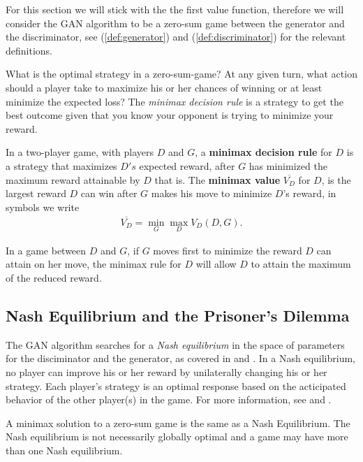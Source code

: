\begin{remark} For this section we will stick with the the first value
  function, therefore we will consider the GAN algorithm to be a
  zero-sum game between the generator and the discriminator, see
  (\ref{def:generator}) and (\ref{def:discriminator}) for the relevant
  definitions.
\end{remark}

What is the optimal strategy in a zero-sum-game? At any given turn,
what action should a player take to maximize his or her chances of
winning or at least minimize the expected loss? The \textit{minimax
  decision rule} is a strategy to get the best outcome given that you
know your opponent is trying to minimize your reward.

\begin{definition}
  \label{def:minimax}
  \label{def:minimax-value} In a two-player game, with players $D$ and
  $G$, a \textbf{minimax decision rule} for $D$ is a strategy that
  maximizes $D's$ expected reward, after $G$ has minimized the maximum
  reward attainable by $D$ that is. The \textbf{minimax value}
  $\overline{V_D}$ for $D$, is the largest reward $D$ can win after
  $G$ makes his move to minimize $D$'s reward, in symbols we write
  \begin{align} \overline{V_D} = \min_{G} \max_{D} V_D(D, {G}).
  \end{align}
\end{definition}

In a game between $D$ and $G$, if $G$ moves first to minimize the
reward $D$ can attain on her move, the minimax rule for $D$ will allow
$D$ to attain the maximum of the reduced reward.

\subsection{Nash Equilibrium and the Prisoner's Dilemma}
\label{sec:nash-dilemma}

The GAN algorithm searches for a \textit{Nash equilibrium} in the
space of parameters for the disciminator and the generator, as covered
in \cite{ref:goodfellow-2016} and \cite{ref:goodfellow-2017}. In a
Nash equilibrium, no player can improve his or her reward by
unilaterally changing his or her strategy. Each player's strategy is
an optimal response based on the acticipated behavior of the other
player(s) in the game. For more information, see \cite{ref:nash-1950}
and \cite{ref:nash-1951}.

A minimax solution to a zero-sum game is the same as a Nash
Equilibrium. The Nash equilibrium is not necessarily globally optimal
and a game may have more than one Nash equilibrium.

